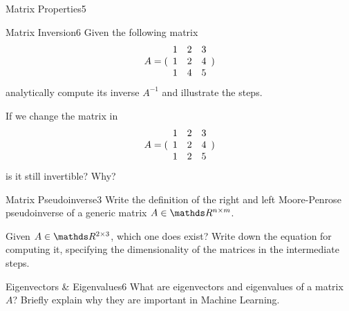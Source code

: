 \begin{questions}
\begin{question}{Matrix Properties}{5}
\begin{answer}
\end{answer}

\end{question}


\begin{question}{Matrix Inversion}{6}
Given the following matrix 
\begin{equation*}
     A = ( \begin{array}{c c c} 
     1 & 2 & 3 \\
     1 & 2 & 4 \\
     1 & 4 & 5 \end{array} )
\end{equation*}
analytically compute its inverse $ A^{-1}$ and illustrate the steps.

If we change the matrix in
\begin{equation*}
     A = ( \begin{array}{c c c} 
     1 & 2 & 3 \\
     1 & 2 & 4 \\
     1 & 2 & 5 \end{array} )
\end{equation*}
is it still invertible? Why?

\begin{answer}\end{answer}

\end{question}
	

\begin{question}{Matrix Pseudoinverse}{3}
	Write the definition of the right and left Moore-Penrose pseudoinverse of a generic matrix $A \in \R^{n\times m}$.
	
	Given $A \in \R^{2 \times 3}$, which one does exist? Write down the equation for computing it, specifying the dimensionality of the matrices in the intermediate steps.
	
\begin{answer}\end{answer}
\end{question}


\begin{question}{Eigenvectors \& Eigenvalues}{6}
What are eigenvectors and eigenvalues of a matrix $A$? Briefly explain why they are important in Machine Learning.

\begin{answer}\end{answer}

\end{question}


\end{questions}
